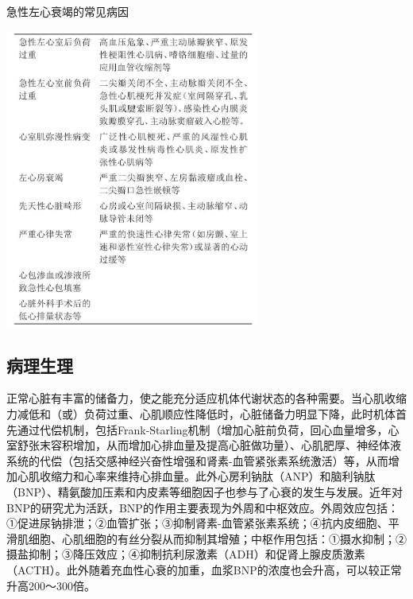 \begin{table}[htbp]
\centering
\caption{急性左心衰竭的常见病因}
\label{tab26-1}
\includegraphics[width=3.28125in,height=3.875in]{./images/Image00093.jpg}
\end{table}

\subsection{病理生理}

正常心脏有丰富的储备力，使之能充分适应机体代谢状态的各种需要。当心肌收缩力减低和（或）负荷过重、心肌顺应性降低时，心脏储备力明显下降，此时机体首先通过代偿机制，包括Frank-Starling机制（增加心脏前负荷，回心血量增多，心室舒张末容积增加，从而增加心排血量及提高心脏做功量）、心肌肥厚、神经体液系统的代偿（包括交感神经兴奋性增强和肾素-血管紧张素系统激活）等，从而增加心肌收缩力和心率来维持心排血量。此外心房利钠肽（ANP）和脑利钠肽（BNP）、精氨酸加压素和内皮素等细胞因子也参与了心衰的发生与发展。近年对BNP的研究尤为活跃，BNP的作用主要表现为外周和中枢效应。外周效应包括：①促进尿钠排泄；②血管扩张；③抑制肾素-血管紧张素系统；④抗内皮细胞、平滑肌细胞、心肌细胞的有丝分裂从而抑制其增殖；中枢作用包括：①摄水抑制；②摄盐抑制；③降压效应；④抑制抗利尿激素（ADH）和促肾上腺皮质激素（ACTH）。此外随着充血性心衰的加重，血浆BNP的浓度也会升高，可以较正常升高200～300倍。

